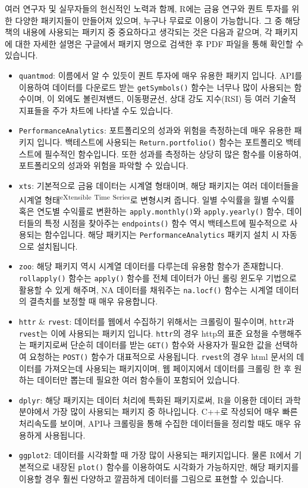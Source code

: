 \documentclass[12pt,]{book}
\begin{document}
여러 연구자 및 실무자들의 헌신적인 노력과 함께, R에는 금융 연구와 퀀트 투자를 위한 다양한 패키지들이 만들어져 있으며, 누구나 무료로 이용이 가능합니다. 그 중 해당 책의 내용에 사용되는 패키지 중 중요하다고 생각되는 것은 다음과 같으며, 각 패키지에 대한 자세한 설명은 구글에서 패키지 명으로 검색한 후 PDF 파일을 통해 확인할 수 있습니다.

\begin{itemize}
\item
  \texttt{quantmod}: 이름에서 알 수 있듯이 퀀트 투자에 매우 유용한 패키지 입니다. API를 이용하여 데이터를 다운로드 받는 \texttt{getSymbols()} 함수는 너무나 많이 사용되는 함수이며, 이 외에도 볼린져밴드, 이동평균선, 상대 강도 지수(RSI) 등 여러 기술적 지표들을 주가 차트에 나타낼 수도 있습니다.
\item
  \texttt{PerformanceAnalytics}: 포트폴리오의 성과와 위험을 측정하는데 매우 유용한 패키지 입니다. 백테스트에 사용되는 \texttt{Return.portfolio()} 함수는 포트폴리오 백테스트에 필수적인 함수입니다. 또한 성과를 측정하는 상당히 많은 함수를 이용하여, 포트폴리오의 성과와 위험을 파악할 수 있습니다.
\item
  \texttt{xts}: 기본적으로 금융 데이터는 시계열 형태이며, 해당 패키지는 여러 데이터들을 시계열 형태\textsuperscript{eXtensible} \textsuperscript{Time} \textsuperscript{Series}로 변형시켜 줍니다. 일별 수익률을 월별 수익률 혹은 연도별 수익률로 변환하는 \texttt{apply.monthly()}와 \texttt{apply.yearly()} 함수, 데이터들의 특정 시점을 찾아주는 \texttt{endpoints()} 함수 역시 백테스트에 필수적으로 사용되는 함수입니다. 해당 패키지는 \texttt{PerformanceAnalytics} 패키지 설치 시 자동으로 설치됩니다.
\item
  \texttt{zoo}: 해당 패키지 역시 시계열 데이터를 다루는데 유용함 함수가 존재합니다. \texttt{rollapply()} 함수는 \texttt{apply()} 함수를 전체 데이터가 아닌 롤링 윈도우 기법으로 활용할 수 있게 해주며, NA 데이터를 채워주는 \texttt{na.locf()} 함수는 시계열 데이터의 결측치를 보정할 때 매우 유용합니다.
\item
  \texttt{httr} \& \texttt{rvest}: 데이터를 웹에서 수집하기 위해서는 크롤링이 필수이며, \texttt{httr}과 \texttt{rvest}는 이에 사용되는 패키지 입니다. \texttt{httr}의 경우 http의 표준 요청을 수행해주는 패키지로써 단순히 데이터를 받는 \texttt{GET()} 함수와 사용자가 필요한 값을 선택하여 요청하는 \texttt{POST()} 함수가 대표적으로 사용됩니다. \texttt{rvest}의 경우 html 문서의 데이터를 가져오는데 사용되는 패키지이며, 웹 페이지에서 데이터를 크롤링 한 후 원하는 데이터만 뽑는데 필요한 여러 함수들이 포함되어 있습니다.
\item
  \texttt{dplyr}: 해당 패키지는 데이터 처리에 특화된 패키지로써, R을 이용한 데이터 과학 분야에서 가장 많이 사용되는 패키지 중 하나입니다. C++로 작성되어 매우 빠른 처리속도를 보이며, API나 크롤링을 통해 수집한 데이터들을 정리할 때도 매우 유용하게 사용됩니다.
\item
  \texttt{ggplot2}: 데이터를 시각화할 때 가장 많이 사용되는 패키지입니다. 물론 R에서 기본적으로 내장된 \texttt{plot()} 함수를 이용하여도 시각화가 가능하지만, 해당 패키지를 이용할 경우 훨씬 다양하고 깔끔하게 데이터를 그림으로 표현할 수 있습니다.
\end{itemize}
\end{document}
